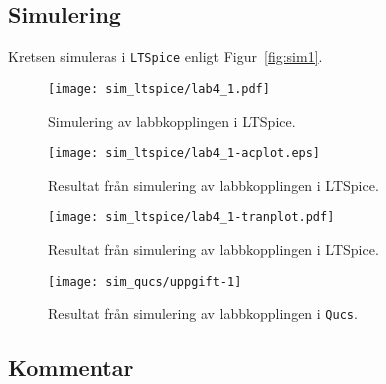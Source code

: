 \subsection{Simulering}\label{}
Kretsen simuleras i \texttt{LTSpice} enligt Figur~\ref{fig:sim1}.

\begin{figure}
    \centering
    \texttt{[image: sim\_ltspice/lab4\_1.pdf]}
    \caption[Simulering av labbkopplingen i LTSpice.]
    {Simulering av labbkopplingen i LTSpice.}
    \label{bode-sim}
\end{figure}

\begin{sidewaysfigure}[ht]
    \centering
    \texttt{[image: sim\_ltspice/lab4\_1-acplot.eps]}
    \caption[Kretsens frekvensåtergivning. Resultat från simulering av
    labbkopplingen i LTSpice.]
    {Resultat från simulering av labbkopplingen i LTSpice.}
    \label{bode-sim}
\end{sidewaysfigure}

\begin{sidewaysfigure}[ht]
    \centering
    \texttt{[image: sim\_ltspice/lab4\_1-tranplot.pdf]}
    \caption[Kretsens transientrespons för olika frekvenser hos V1. Resultat
från simulering av labbkopplingen i LTSpice.]
    {Resultat från simulering av labbkopplingen i LTSpice.}
    \label{bode-sim}
\end{sidewaysfigure}

\begin{figure}
    \centering
    \texttt{[image: sim\_qucs/uppgift-1]}
    \caption[Labbkopplingens frekvensåtergivning. Simulering i \texttt{Qucs}.]
    {Resultat från simulering av labbkopplingen i \texttt{Qucs}.}
    \label{bode-sim}
\end{figure}


\subsection{Kommentar}\label{}


